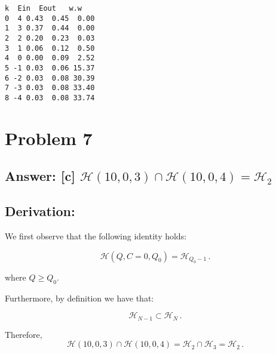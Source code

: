 \documentclass[11pt]{article}
\makeatletter
\newcommand{\boxspacing}{\kern\kvtcb@left@rule\kern\kvtcb@boxsep}
\newcommand{\prompt}[4]{
        \ttfamily\llap{{\color{#2}[#3]:\hspace{3pt}#4}}\vspace{-\baselineskip}
    }
\makeatother
\begin{document}
            \begin{tcolorbox}[breakable, size=fbox, boxrule=.5pt, pad at break*=1mm, opacityfill=0]
\prompt{Out}{outcolor}{165}{\boxspacing}
\begin{Verbatim}[commandchars=\\\{\}]
   k  Ein  Eout   w.w
0  4 0.43  0.45  0.00
1  3 0.37  0.44  0.00
2  2 0.20  0.23  0.03
3  1 0.06  0.12  0.50
4  0 0.00  0.09  2.52
5 -1 0.03  0.06 15.37
6 -2 0.03  0.08 30.39
7 -3 0.03  0.08 33.40
8 -4 0.03  0.08 33.74
\end{Verbatim}
\end{tcolorbox}
        
    \hypertarget{problem-7}{%
\section{Problem 7}\label{problem-7}}

\hypertarget{answer-c-mathcalh1003cap-mathcalh1004mathcalh_2}{%
\subsection{\texorpdfstring{Answer: {[}c{]}
\(\mathcal{H}(10,0,3)\cap \mathcal{H}(10,0,4)=\mathcal{H}_2\)}{Answer: {[}c{]} \textbackslash{}mathcal\{H\}(10,0,3)\textbackslash{}cap \textbackslash{}mathcal\{H\}(10,0,4)=\textbackslash{}mathcal\{H\}\_2}}\label{answer-c-mathcalh1003cap-mathcalh1004mathcalh_2}}

\hypertarget{derivation}{%
\subsection{Derivation:}\label{derivation}}

We first observe that the following identity holds:

\begin{equation}
\mathcal{H}(Q,C=0,Q_0)=\mathcal{H}_{Q_0-1}\,.
\end{equation}

where \(Q \ge Q_0\).

Furthermore, by definition we have that:

\begin{equation}
\mathcal{H}_{N-1}\subset\mathcal{H}_{N}\,.
\end{equation}

Therefore, \begin{equation}
\mathcal{H}(10,0,3)\cap \mathcal{H}(10,0,4)=\mathcal{H}_2\cap \mathcal{H}_3=\mathcal{H}_2\,.
\end{equation}
\end{document}
